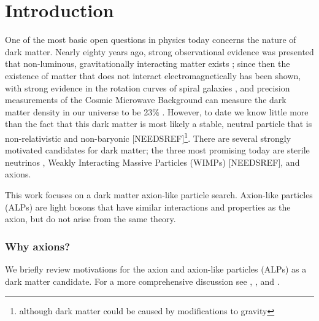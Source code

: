 \documentclass[12pt,twosides]{book}
\begin{document}
\tableofcontents
\chapter{Introduction}


One of the most basic open questions in physics today concerns the nature of dark matter. Nearly eighty years ago, strong observational evidence was presented that non-luminous, gravitationally interacting matter exists \cite{zwicky37}; since then the existence of matter that does not interact electromagnetically has been shown, with strong evidence in the rotation curves of spiral galaxies \cite{rubin80}, and precision measurements of the Cosmic Microwave Background can measure the dark matter density in our universe to be 23$\%$ \cite{planck14}. However, to date we know little more than the fact that this dark matter is most likely a stable, neutral particle that is non-relativistic and non-baryonic [NEEDSREF]\footnote{although dark matter could be caused by modifications to gravity}. There are several strongly motivated candidates for dark matter; the three most promising today are sterile neutrinos \cite{kusenko09}, Weakly Interacting Massive Particles (WIMPs) [NEEDSREF], and axions. 

This work focuses on a dark matter axion-like particle search. Axion-like particles (ALPs) are light bosons that have similar interactions and properties as the axion, but do not arise from the same theory.

\subsection{Why axions?}

We briefly review motivations for the axion and axion-like particles (ALPs) as a dark matter candidate. For a more comprehensive discussion see \cite{hewett12}, \cite{arias12}, and \cite{kim87}.
\end{document}
